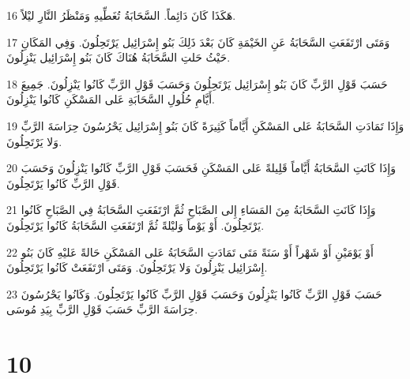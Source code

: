 \par 16 هَكَذَا كَانَ دَائِماً. السَّحَابَةُ تُغَطِّيهِ وَمَنْظَرُ النَّارِ ليْلاً.
\par 17 وَمَتَى ارْتَفَعَتِ السَّحَابَةُ عَنِ الخَيْمَةِ كَانَ بَعْدَ ذَلِكَ بَنُو إِسْرَائِيل يَرْتَحِلُونَ. وَفِي المَكَانِ حَيْثُ حَلتِ السَّحَابَةُ هُنَاكَ كَانَ بَنُو إِسْرَائِيل يَنْزِلُونَ.
\par 18 حَسَبَ قَوْلِ الرَّبِّ كَانَ بَنُو إِسْرَائِيل يَرْتَحِلُونَ وَحَسَبَ قَوْلِ الرَّبِّ كَانُوا يَنْزِلُونَ. جَمِيعَ أَيَّامِ حُلُولِ السَّحَابَةِ عَلى المَسْكَنِ كَانُوا يَنْزِلُونَ.
\par 19 وَإِذَا تَمَادَتِ السَّحَابَةُ عَلى المَسْكَنِ أَيَّاماً كَثِيرَةً كَانَ بَنُو إِسْرَائِيل يَحْرُسُونَ حِرَاسَةَ الرَّبِّ وَلا يَرْتَحِلُونَ.
\par 20 وَإِذَا كَانَتِ السَّحَابَةُ أَيَّاماً قَلِيلةً عَلى المَسْكَنِ فَحَسَبَ قَوْلِ الرَّبِّ كَانُوا يَنْزِلُونَ وَحَسَبَ قَوْلِ الرَّبِّ كَانُوا يَرْتَحِلُونَ.
\par 21 وَإِذَا كَانَتِ السَّحَابَةُ مِنَ المَسَاءِ إِلى الصَّبَاحِ ثُمَّ ارْتَفَعَتِ السَّحَابَةُ فِي الصَّبَاحِ كَانُوا يَرْتَحِلُونَ. أَوْ يَوْماً وَليْلةً ثُمَّ ارْتَفَعَتِ السَّحَابَةُ كَانُوا يَرْتَحِلُونَ.
\par 22 أَوْ يَوْمَيْنِ أَوْ شَهْراً أَوْ سَنَةً مَتَى تَمَادَتِ السَّحَابَةُ عَلى المَسْكَنِ حَالةً عَليْهِ كَانَ بَنُو إِسْرَائِيل يَنْزِلُونَ وَلا يَرْتَحِلُونَ. وَمَتَى ارْتَفَعَتْ كَانُوا يَرْتَحِلُونَ.
\par 23 حَسَبَ قَوْلِ الرَّبِّ كَانُوا يَنْزِلُونَ وَحَسَبَ قَوْلِ الرَّبِّ كَانُوا يَرْتَحِلُونَ. وَكَانُوا يَحْرُسُونَ حِرَاسَةَ الرَّبِّ حَسَبَ قَوْلِ الرَّبِّ بِيَدِ مُوسَى.

\chapter{10}

